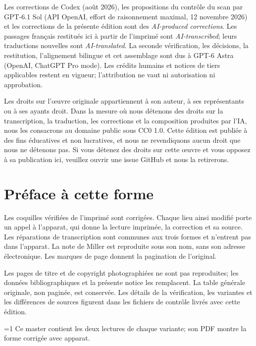 \documentclass[oneside]{book}
\theoremstyle{sga-source}
\theoremstyle{sga-source-dash}
\theoremstyle{sga-source-dotdash}
\theoremstyle{sga-source-number-note-dash}
\theoremstyle{sga-source-note-number-dotdash}
\theoremstyle{sga-source-example-dotdash}
\theoremstyle{sga-source-inline-number}
\theoremstyle{sga-source-bare-number}
\theoremstyle{sga-source}
\providecommand\EditionIsMaster{1}
\begin{document}
\medskip
Les corrections de Codex (août 2026), les propositions du contrôle du scan
par GPT-6.1 Sol (API OpenAI, effort de raisonnement maximal, 12 novembre
2026) et les corrections de la présente édition sont des
\emph{AI-produced corrections}. Les passages français restitués ici à
partir de l’imprimé sont \emph{AI-transcribed}; leurs traductions nouvelles
sont \emph{AI-translated}. La seconde vérification, les décisions, la
restitution, l’alignement bilingue et cet assemblage sont dus à GPT-6 Astra
(OpenAI, ChatGPT Pro mode). Les crédits humains et notices de tiers
applicables restent en vigueur; l’attribution ne vaut ni autorisation ni
approbation.

\medskip
Les droits sur l'œuvre originale appartiennent à son auteur, à ses représentants ou à ses ayants
droit. Dans la mesure où nous détenons des droits sur la transcription, la traduction, les corrections et la
composition produites par l'IA, nous les consacrons au domaine public sous CC0 1.0. Cette édition est publiée
à des fins éducatives et non lucratives, et nous ne revendiquons aucun droit que nous ne détenons pas. Si vous
détenez des droits sur cette œuvre et vous opposez à sa publication ici, veuillez ouvrir une issue GitHub et
nous la retirerons.

\chapter*{Préface à cette forme}
Les coquilles vérifiées de l’imprimé sont corrigées. Chaque lieu
ainsi modifié porte un appel à l’apparat, qui donne la lecture imprimée,
la correction et sa source. Les réparations de transcription sont communes
aux trois formes et n’entrent pas dans l’apparat. La note de Miller est
reproduite sous son nom, sans son adresse électronique. Les marques de
page donnent la pagination de l’original.

Les pages de titre et de copyright photographiées ne sont pas reproduites;
les données bibliographiques et la présente notice les remplacent. La
table générale originale, non paginée, est conservée. Les détails de la
vérification, les variantes et les différences de sources figurent dans
les fichiers de contrôle livrés avec cette édition.

\ifnum\EditionIsMaster=1\relax
Ce master contient les deux lectures de chaque variante; son PDF montre la forme corrigée avec apparat.
\fi

\clearpage

\or
\end{document}

